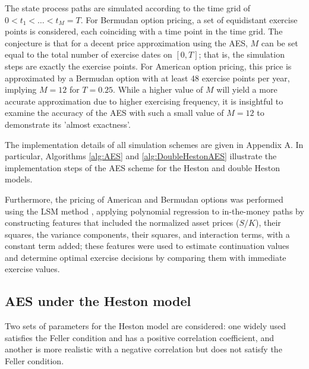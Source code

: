 \documentclass[]{interact}
\theoremstyle{plain}%
\theoremstyle{definition}
\theoremstyle{remark}
\begin{document}
The state process paths are simulated according to the time grid of $0 < t_1 < \ldots < t_M = T$. For Bermudan option pricing, a set of equidistant exercise points is considered, each coinciding with a time point in the time grid. The conjecture is that for a decent price approximation using the AES, $M$ can be set equal to the total number of exercise dates on $[0,T]$; that is, the simulation steps are exactly the exercise points. For American option pricing, this price is approximated by a Bermudan option with at least 48 exercise points per year, implying $M=12$ for $T=0.25$. While a higher value of $M$ will yield a more accurate approximation due to higher exercising frequency, it is insightful to examine the accuracy of the AES with such a small value of $M=12$ to demonstrate its 'almost exactness'.

The implementation details of all simulation schemes are given in Appendix A. In particular,  Algorithms \ref{alg:AES} and \ref{alg:DoubleHestonAES} illustrate the implementation steps of the AES scheme for the Heston and double Heston models.

Furthermore, the pricing of American and Bermudan options was performed using the LSM method \cite{longstaff2001valuing}, applying polynomial regression to in-the-money paths by constructing features that included the normalized asset prices ($S/K$), their squares, the variance components, their squares, and interaction terms, with a constant term added; these features were used to estimate continuation values and determine optimal exercise decisions by comparing them with immediate exercise values.



\subsection{AES under the Heston model}

Two sets of parameters for the Heston model are considered: one widely used satisfies the Feller condition and has a positive correlation coefficient, and another is more realistic with a negative correlation but does not satisfy the Feller condition.
\end{document}
